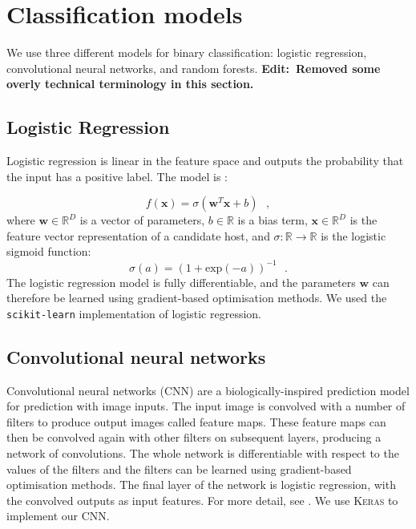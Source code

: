 \documentclass[fleqn,usenatbib,usedcolumn]{mnras}
\renewcommand{\vec}[1]{\mathbf{#1}}
\newcommand{\edit}[1]{{\bf Edit:~{#1}}}
\begin{document}
\appendix

\section{Classification models}\label{app:models}

  We use three different models for binary classification: logistic regression, convolutional neural networks, and random forests. \edit{Removed some overly technical terminology in this section.}

  \subsection{Logistic Regression}
  \label{sec:logistic-regression}
    Logistic regression is linear in the feature space and outputs the probability that the input has a positive label. The model is \citep{bishop06ml}:

    \begin{equation}
        f(\vec x) = \sigma(\vec w^T \vec x + b) \,\,\,\,,
    \end{equation}
    where $\vec w \in \mathbb{R}^D$ is a vector of parameters, $b \in \mathbb{R}$ is a bias term, $\vec x \in \mathbb{R}^D$ is the feature vector representation of a candidate host, and $\sigma : \mathbb{R} \to \mathbb{R}$ is the logistic sigmoid function: \begin{equation}
        \sigma(a) = (1 + \mathrm{exp}(-a))^{-1}\,\,\,\,.
    \end{equation}%
    The logistic regression model is fully differentiable, and the parameters $\vec w$ can therefore be learned using gradient-based optimisation methods. We used the \texttt{scikit-learn} \citep{pedregosa11sklearn} implementation of logistic regression.

  \subsection{Convolutional neural networks}
  \label{sec:convolutional-neural-networks}

    Convolutional neural networks (CNN) are a biologically-inspired prediction model for prediction with image inputs. The input image is convolved with a number of filters to produce output images called feature maps. These feature maps can then be convolved again with other filters on subsequent layers, producing a network of convolutions. The whole network is differentiable with respect to the values of the filters and the filters can be learned using gradient-based optimisation methods. The final layer of the network is logistic regression, with the convolved outputs as input features. For more detail, see \citet[subsection II.A][]{lecun98}. We use \textsc{Keras} \citep{chollet15keras} to implement our CNN.
\end{document}
